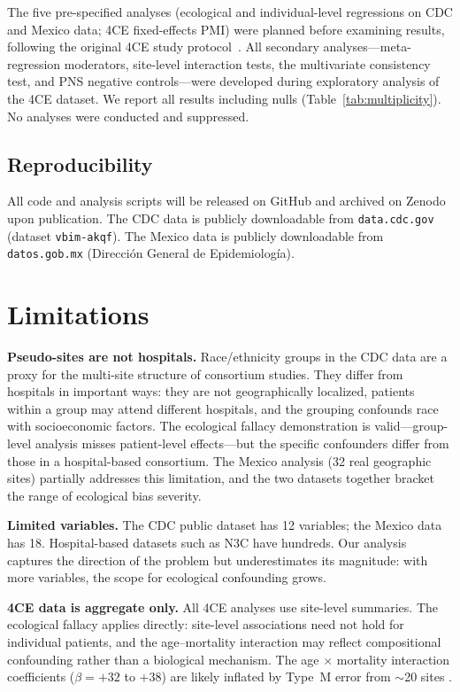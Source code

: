 \documentclass{article}
\begin{document}
The five pre-specified analyses (ecological and individual-level
regressions on CDC and Mexico data; 4CE fixed-effects PMI) were planned
before examining results, following the original 4CE study
protocol~\cite{four_ce_neuro2021}.  All secondary analyses---meta-regression
moderators, site-level interaction tests, the multivariate consistency
test, and PNS negative controls---were developed during exploratory
analysis of the 4CE dataset.  We report all results including nulls
(Table~\ref{tab:multiplicity}).  No analyses were conducted and suppressed.

\subsection{Reproducibility}

All code and analysis scripts will be released on GitHub and archived on
Zenodo upon publication.
The CDC data is publicly downloadable from \texttt{data.cdc.gov} (dataset
\texttt{vbim-akqf}).  The Mexico data is publicly downloadable from
\texttt{datos.gob.mx} (Direcci\'{o}n General de Epidemiolog\'{i}a).


\section{Limitations}

\textbf{Pseudo-sites are not hospitals.}  Race/ethnicity groups in the CDC
data are a proxy for the multi-site structure of consortium studies.  They
differ from hospitals in important ways: they are not geographically
localized, patients within a group may attend different hospitals, and the
grouping confounds race with socioeconomic factors.  The ecological fallacy
demonstration is valid---group-level analysis misses patient-level
effects---but the specific confounders differ from those in a hospital-based
consortium.  The Mexico analysis (32 real geographic sites) partially
addresses this limitation, and the two datasets together bracket the range
of ecological bias severity.

\textbf{Limited variables.}  The CDC public dataset has 12 variables; the
Mexico data has 18.  Hospital-based datasets such as N3C have hundreds.
Our analysis captures the direction of the problem but underestimates its
magnitude: with more variables, the scope for ecological confounding grows.

\textbf{4CE data is aggregate only.}  All 4CE analyses use site-level
summaries.  The ecological fallacy applies directly: site-level associations
need not hold for individual patients, and the age--mortality interaction may
reflect compositional confounding rather than a biological mechanism.  The
age $\times$ mortality interaction coefficients ($\beta = +32$ to $+38$) are
likely inflated by Type~M error from $\sim$20 sites
\cite{gelman2014typeMS}.
\end{document}
